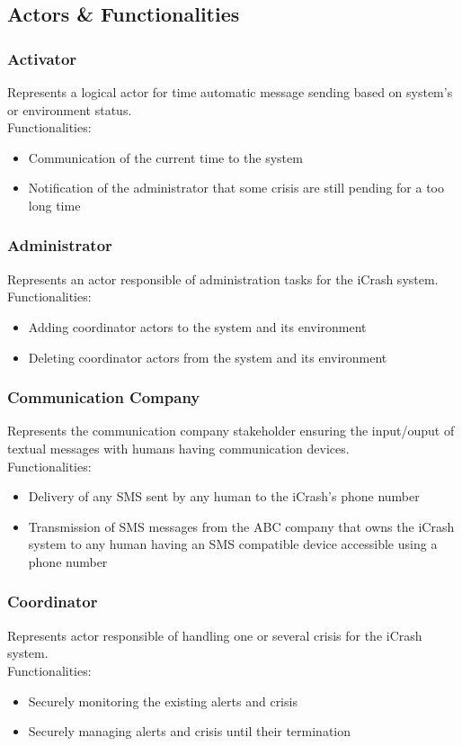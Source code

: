\subsection{Actors \& Functionalities}

\subsubsection{Activator}
Represents a logical actor for time automatic message sending based on system’s
or environment status.\\
Functionalities:
\begin{itemize}
  \item Communication of the current time to the system
  \item Notification of the administrator that some crisis are still pending for
  a too long time
\end{itemize}

\subsubsection{Administrator}
Represents an actor responsible of administration tasks for the iCrash system.\\
Functionalities:
\begin{itemize}
  \item Adding coordinator actors to the system and its environment
  \item Deleting coordinator actors from the system and its environment
\end{itemize}

\subsubsection{Communication Company}
Represents the communication company stakeholder ensuring the input/ouput of
textual messages with humans having communication devices.\\
Functionalities:
\begin{itemize}
  \item Delivery of any SMS sent by any human to the iCrash's phone number
  \item Transmission of SMS messages from the ABC company that owns the iCrash
  system to any human having an SMS compatible device accessible using a phone
  number
\end{itemize}

\subsubsection{Coordinator}
Represents actor responsible of handling one or several crisis for the iCrash
system.\\
Functionalities:
\begin{itemize}
  \item Securely monitoring the existing alerts and crisis
  \item Securely managing alerts and crisis until their termination
\end{itemize}

